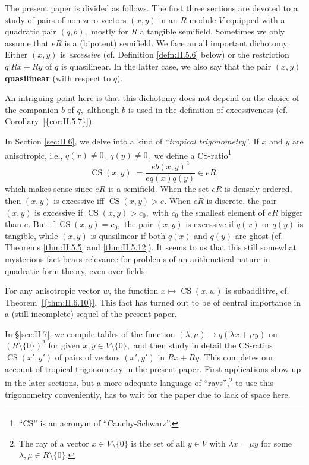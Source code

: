 \documentclass [12pt,a4paper,reqno]{amsart}
\begin{document}
\medskip
The present paper is divided as follows. The first three sections
are devoted to a study of pairs of non-zero vectors $(x,y)$ in  an
$R$-module $V$ equipped with a quadratic pair $(q, b),$ mostly for
$R$ a tangible semifield. Sometimes we only assume that $eR$ is a
(bipotent) semifield. We face an all important dichotomy. Either
$(x,y)$ is \textit{excessive} (cf. Definition \ref{defn:II.5.6}
below) or the restriction $q|Rx+Ry$ of $q$ is quasilinear. In the
latter case, we also say that the pair $(x,y)$ {\textbf{{quasilinear}}}
(with respect to $q)$.

An intriguing point here is that this dichotomy does not depend on
the choice of the companion $b$ of $q,$ although $b$ is used in
the definition of excessiveness (cf. {Corollary~\ref{{cor:II.5.7}}}).

In Section \ref{sec:II.6}, we delve into a kind of ``\textit{tropical
trigonometry}''. If $x$ and $y$ are anisotropic, i.e., $q(x)\ne0,$
$q(y)\ne0,$ we define a CS-ratio\footnote{``CS'' is an acronym of
``Cauchy-Schwarz''.}
\begin{equation}\label{eq:0.10}
{\operatorname{CS}}(x,y):=\frac{eb(x,y)^2}{eq(x)q(y)}\in eR,
\end{equation}
which makes sense since $eR$ is a semifield.
When the set $eR$ is densely ordered, then $(x,y)$ is excessive
iff ${\operatorname{CS}}(x,y)>e.$ When $eR$ is discrete, the pair $(x,y)$ is
excessive if ${\operatorname{CS}}(x,y)>c_0,$ with $c_0$ the smallest element of
$eR$ bigger than $e.$ But if ${\operatorname{CS}}(x,y)=c_0,$ the pair $(x,y)$ is
excessive if $q(x)$ or $q(y)$ is tangible, while $(x,y)$ is
quasilinear if both $q(x)$ and $q(y)$ are ghost (cf. Theorems
\ref{thm:II.5.5} and \ref{thm:II.5.12}). It seems to us that
this still somewhat mysterious fact bears relevance for problems
of an arithmetical nature in quadratic form theory, even over
fields.

For any anisotropic vector $w$, the function $x\mapsto
{\operatorname{CS}}(x,w)$ is subadditive, cf. {Theorem~\ref{{thm:II.6.10}}}. This fact
has turned out to be of central importance in a (still incomplete)
sequel \cite{QF3} of the present paper.

In \S\ref{sec:II.7}, we compile tables of the function
$({\lambda},\mu)\mapsto q({\lambda} x+\mu y)$ on $(R{\setminus}\{0\})^2$
for given $x,y\in V{\setminus}\{0\},$ and then study in detail the
CS-ratios ${\operatorname{CS}}(x',y')$ of pairs of vectors $(x',y')$ in $Rx+Ry.$
This completes our account of tropical trigonometry in the present
paper. First applications show up in the later sections, but a
more adequate language of ``rays'',\footnote{The ray of a vector
$x\in V{\setminus}\{0\}$ is the set of all $y\in V$ with ${\lambda}
x=\mu y$ for some ${\lambda},\mu\in R{\setminus}\{0\}.$} to use this
trigonometry conveniently, has to wait for the paper \cite{QF3}
due to lack of space here.
\end{document}

